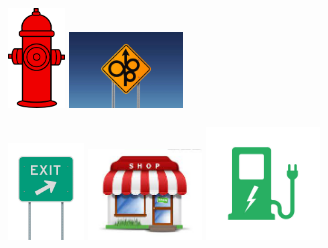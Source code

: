 \documentclass{beamer}
\begin{document}
\begin{frame}
\begin{exampleblock}{}
\end{exampleblock}
\pause
\begin{figure}
\hspace*{-3mm}%
\centering
   \pause
   \includegraphics[width=1.5cm]{pics/hydrant.png}
   \pause
   \includegraphics[width=3cm]{pics/crazy.jpg}
\end{figure}
\pause
\begin{figure}
\hspace*{-3mm}%
\centering
   \includegraphics[width=2cm]{pics/exit.jpg}
   \pause
   \includegraphics[width=3cm]{pics/shop.jpeg}
   \pause
   \includegraphics[width=3cm]{pics/charge.jpg}
\end{figure}
  
\end{frame}
\end{document}
